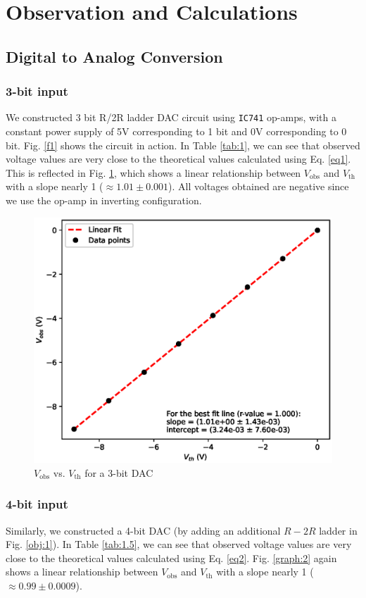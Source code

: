 \section{Observation and Calculations}
\subsection{Digital to Analog Conversion}
\subsubsection{3-bit input}
We constructed 3 bit R/2R ladder DAC circuit using \verb|IC741| op-amps, with a constant power supply of 5V corresponding to 1 bit and 0V corresponding to 0 bit. Fig. \ref{f1} shows the circuit in action. In Table \ref{tab:1}, we can see that observed voltage values are very close to the theoretical values calculated using Eq. \ref{eq1}. This is reflected in Fig. \ref{g1}, which shows a linear relationship between $V_\text{obs}$ and $V_\text{th}$ with a slope nearly 1 ($\approx 1.01 \pm 0.001$). All voltages obtained are negative since we use the op-amp in inverting configuration.



\begin{figure}
    \centering
    \includegraphics[width=1\columnwidth]{images/3bit.eps}
    \caption{$V_\text{obs}$ vs. $V_\text{th}$ for a 3-bit DAC}
    \label{g1}
\end{figure}

\subsubsection{4-bit input}
Similarly, we constructed a 4-bit DAC (by adding an additional $R-2R$ ladder in Fig. \ref{obj:1}). In Table \ref{tab:1.5}, we can see that observed voltage values are very close to the theoretical values calculated using Eq. \ref{eq2}. Fig. \ref{graph:2} again shows a linear relationship between $V_\text{obs}$ and $V_\text{th}$ with a slope nearly 1 ($\approx 0.99 \pm 0.0009$).


